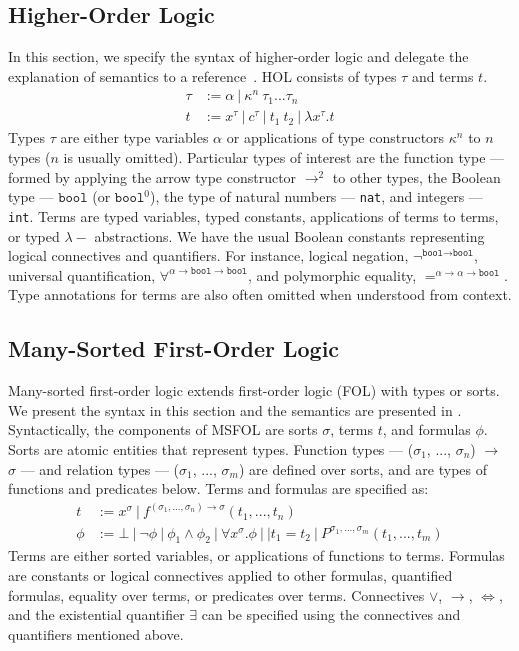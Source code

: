 \documentclass{article}
\begin{document}
	\subsection{Higher-Order Logic}
	\label{sec:hol}
	In this section, we specify the 
	syntax of higher-order logic 
	and delegate the explanation of 
	semantics to a 
	reference~\cite{10.5555/155278}. 
	HOL consists of 
	types $\tau$ and terms $t$. 
	\begin{align*}
	\tau &:= \alpha\ |\ \kappa^n\ 
	\tau_1 ... \tau_n\\
	t &:= x^{\tau}\ |\ c^{\tau}\ |\ t_1\ t_2\ 
	|\ \lambda x^{\tau}.t
	\end{align*}	
	Types $\tau$ are either type
	variables $\alpha$ or 
	applications of type 
	constructors $\kappa^n$ to 
	$n$ types ($n$ is usually omitted). 
	Particular types of interest are 
	the function type --- formed by 
	applying the arrow type constructor 
	$\to^{2}$ to other types, the 
	Boolean type --- $\texttt{bool}$ 
	(or $\texttt{bool}^0$), the type of 
	natural numbers --- \texttt{nat},
	and integers --- \texttt{int}.
	Terms are typed variables, 
	typed constants, applications 
	of terms to terms, or typed
	$\lambda-$ abstractions. We have
	the usual Boolean constants 
	representing logical connectives
	and quantifiers. For instance, 
	logical negation, 
	$\neg^{\texttt{bool} \to 
	\texttt{bool}}$, universal 
	quantification,
	$\forall^{\alpha \to 
	\texttt{bool} \to \texttt{bool}}$, 
	and polymorphic equality,
	$=^{\alpha \to \alpha 
	\to \texttt{bool}}$. Type 
	annotations for terms are also 
	often omitted when understood
	from context.

	\subsection{Many-Sorted First-Order Logic}
	\label{sec:msfol}
	Many-sorted first-order logic extends
	first-order logic (FOL) with 
	types or sorts. We present the 
	syntax in this section and the 
	semantics are presented in
	\cite{Barrett2018}. Syntactically, 
	the components of MSFOL are sorts 
	$\sigma$, terms $t$, and 
	formulas $\phi$. Sorts are 
	atomic entities that 
	represent types. Function types 
	--- ($\sigma_1$, ..., $\sigma_n$) 
	$\to$ $\sigma$ ---
	and relation types 
	--- ($\sigma_1$, ..., $\sigma_m$)
	are defined over sorts, and 
	are types of functions and 
	predicates below. Terms and 
	formulas are specified as:
	\begin{align*}
		t &:= x^{\sigma}\ |\ 
		f^{(\sigma_1, ..., \sigma_n) \to 
		\sigma}	(t_1, ..., t_n)\\
		\phi &:= \bot\ |\ \neg \phi\ |\ 
		\phi_1 \land \phi_2\ |\ \forall 
		x^{\sigma} . \phi\ |\ | t_1 = t_2
		\ |\ P^{\sigma_1,...,\sigma_m}
		(t_1, ..., t_m)
	\end{align*}
	Terms are either sorted variables, 
	or applications of functions to terms.
	Formulas are constants or logical 
	connectives applied to other 
	formulas, quantified formulas, 
	equality over terms, or predicates 
	over terms. Connectives $\lor$, 
	$\to$, $\iff$, and the existential
	quantifier $\exists$ can be 
	specified using the connectives 
	and quantifiers mentioned above.
	
\end{document}
